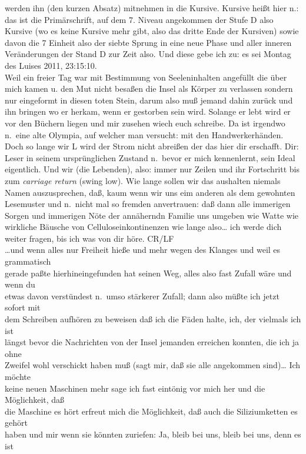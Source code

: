 \documentclass[
]{article}
\begin{document}
werden ihn (den kurzen Absatz) mitnehmen in die Kursive. Kursive heißt
hier n.: das ist die Primärschrift, auf dem 7. Niveau angekommen der
Stufe D also Kursive (wo es keine Kursive mehr gibt, also das dritte
Ende der Kursiven) sowie davon die 7 Einheit also der siebte Sprung in
eine neue Phase und aller inneren Veränderungen der Stand D zur Zeit
also. Und diese gebe ich zu: es sei Montag des Luises 2011, 23:15:10.\\
Weil ein freier Tag war mit Bestimmung von Seeleninhalten angefüllt die
über mich kamen u. den Mut nicht besaßen die Insel als Körper zu
verlassen sondern nur eingeformt in diesen toten Stein, darum also muß
jemand dahin zurück und ihn bringen wo er herkam, wenn er gestorben sein
wird. Solange er lebt wird er vor den Büchern liegen und mir zusehen
wiech euch schreibe. Da ist irgendwo n.~eine alte Olympia, auf welcher
man versucht: mit den Handwerkerhänden. Doch so lange wir L wird der
Strom nicht abreißen der das hier dir erschafft. Dir: Leser in seinem
ursprünglichen Zustand n.~bevor er mich kennenlernt, sein Ideal
eigentlich. Und wir (die Lebenden), also: immer nur Zeilen und ihr
Fortschritt bis zum \emph{carriage return} (swing low). Wie lange sollen
wir das aushalten niemals Namen auszusprechen, daß, kaum wenn wir uns
eim anderen als dem gewohnten Lesemuster und n.~nicht mal so fremden
anvertrauen: daß dann alle immerigen Sorgen und immerigen Nöte der
annäherndn Familie uns umgeben wie Watte wie wirkliche Bäusche von
Celluloseinkontinenzen wie lange also\ldots{} ich werde dich weiter
fragen, bis ich was von dir höre. CR/LF\\
\ldots und wenn alles nur Freiheit hieße und mehr wegen des Klanges und
weil es grammatisch\\
gerade paßte hierhineingefunden hat seinen Weg, alles also fast Zufall
wäre und wenn du\\
etwas davon verstündest n.~umso stärkerer Zufall; dann also müßte ich
jetzt sofort mit\\
dem Schreiben aufhören zu beweisen daß ich die Fäden halte, ich, der
vielmals ich ist\\
längst bevor die Nachrichten von der Insel jemanden erreichen konnten,
die ich ja ohne\\
Zweifel wohl verschickt haben muß (sagt mir, daß sie alle angekommen
sind)\ldots{} Ich möchte\\
keine neuen Maschinen mehr sage ich fast eintönig vor mich her und die
Möglichkeit, daß\\
die Maschine es hört erfreut mich die Möglichkeit, daß auch die
Siliziumketten es gehört\\
haben und mir wenn sie könnten zuriefen: Ja, bleib bei uns, bleib bei
uns, denn es ist
\end{document}
